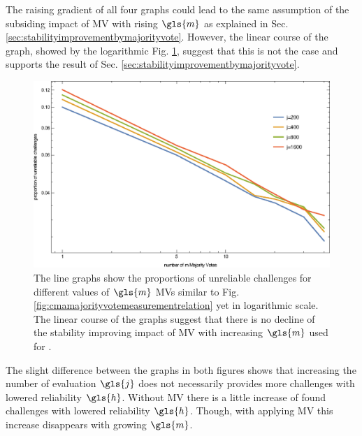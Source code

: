 The raising gradient of all four graphs could lead to the same assumption of the subsiding impact of \ac{MV} with rising $\gls{m}$ as explained in Sec. \ref{sec:stabilityimprovementbymajorityvote}.
However, the linear course of the graph, showed by the logarithmic Fig. \ref{fig:cmamajorityvotemeasurementrelationloglog}, suggest that this is not the case and supports the result of Sec. \ref{sec:stabilityimprovementbymajorityvote}.

\begin{figure}[ht]
\includegraphics[width=1.00\textwidth]{images/mv-measurements-unstableChallenges_loglog.eps}
\caption[Proportion of unreliable challenges logarithmic]{The line graphs show the proportions of unreliable challenges for different values of $\gls{m}$ \acp{MV} similar to Fig. \ref{fig:cmamajorityvotemeasurementrelation} yet in logarithmic scale. The linear course of the graphs suggest that there is no decline of the stability improving impact of \ac{MV} with increasing $\gls{m}$ used for \mpufs.}
\label{fig:cmamajorityvotemeasurementrelationloglog}
\end{figure}

The slight difference between the graphs in both figures shows that increasing the number of evaluation $\gls{j}$ does not necessarily provides more challenges with lowered reliability $\gls{h}$.
Without \ac{MV} there is a little increase of found challenges with lowered reliability $\gls{h}$.
Though, with applying \ac{MV} this increase disappears with growing $\gls{m}$.

